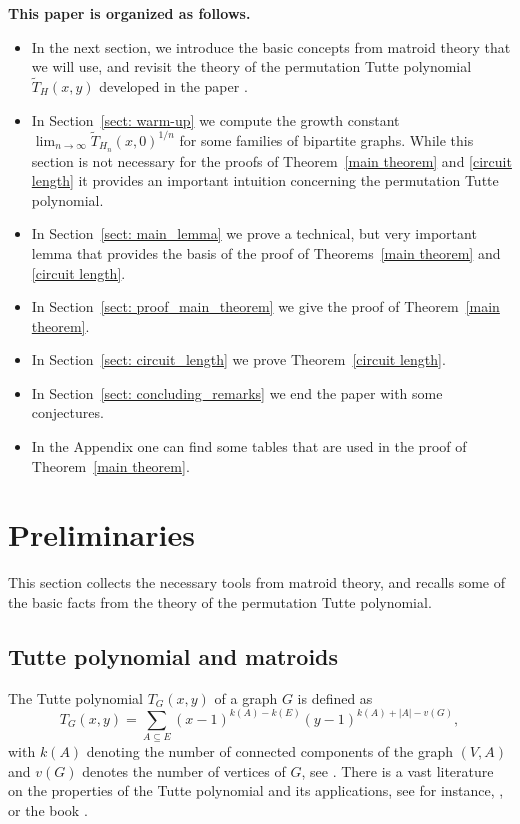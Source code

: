 \documentclass[12pt,a4paper]{amsart}
\numberwithin{equation}{section}
\theoremstyle{plain}
\theoremstyle{definition}
\newcommand{\1}{\textbf{1}}
\newcommand{\wT}{\widetilde{T}}
\begin{document}
\noindent \textbf{This paper is organized as follows.} 
\begin{itemize}
\item In the next section, we introduce the basic concepts from matroid theory that we will use, and revisit the theory of the permutation Tutte polynomial $\wT_H(x,y)$ developed in the paper \cite{beke2024permutation}. 
\item In Section~\ref{sect: warm-up} we compute the growth constant $\lim_{n\to \infty}\wT_{H_n}(x,0)^{1/n}$ for some families of bipartite graphs. While this section is not necessary for the proofs of Theorem~\ref{main theorem} and \ref{circuit length} it provides an important intuition concerning the permutation Tutte polynomial. 
\item In Section~\ref{sect: main_lemma} we prove a technical, but very important lemma that provides the basis of the proof of Theorems~\ref{main theorem} and \ref{circuit length}.
\item In Section~\ref{sect: proof_main_theorem} we give the proof of Theorem~\ref{main theorem}. \item In Section~\ref{sect: circuit_length} we prove Theorem~\ref{circuit length}.
\item In Section~\ref{sect: concluding_remarks} we end the paper with some conjectures.
\item In the Appendix one can find some tables that are used in the proof of Theorem~\ref{main theorem}.
\end{itemize}



\section{Preliminaries}
\label{preliminaries}

This section collects the necessary tools from matroid theory, and recalls some of the basic facts from the theory of the permutation Tutte polynomial.

\subsection{Tutte polynomial and matroids}
The Tutte polynomial $T_G(x,y)$ of a graph $G$ is defined as
$$T_G(x,y)=\sum_{A\subseteq E}(x-1)^{k(A)-k(E)}(y-1)^{k(A)+|A|-v(G)},$$
with $k(A)$ denoting the number of connected components of the graph $(V,A)$ and $v(G)$ denotes the number of vertices of $G$, see \cite{tutte1954contribution}.
There is a vast literature on the properties of the Tutte polynomial and its applications, see for instance, \cite{brylawski1992tutte,crapo1969tutte,ellis2011graph,welsh1999tutte}, or the book \cite{ellis2022handbook}.
\end{document}
